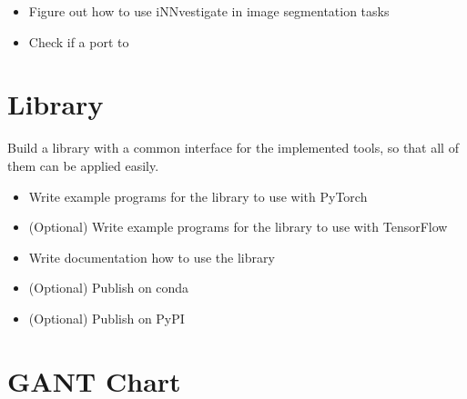 \begin{itemize}
    \item Figure out how to use iNNvestigate in image segmentation tasks
    \item Check if a port to 
\end{itemize}

\fi

\section*{Library}
Build a library with a common interface for the implemented tools, so that all of them can be applied easily.
\begin{itemize}
    \item Write example programs for the library to use with PyTorch
    \item (Optional) Write example programs for the library to use with TensorFlow
    \item Write documentation how to use the library
    \item (Optional) Publish on conda
    \item (Optional) Publish on PyPI
    
\end{itemize}

\section*{GANT Chart}
